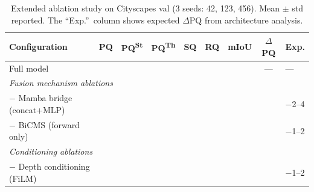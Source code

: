\documentclass[10pt,twocolumn,letterpaper]{article}
\begin{document}
\begin{table}[t]
\centering
\caption{Extended ablation study on Cityscapes val (3 seeds: 42, 123, 456). Mean $\pm$ std reported. The ``Exp.''\ column shows expected $\Delta$PQ from architecture analysis.}
\label{tab:ablations_extended}
\setlength{\tabcolsep}{3.5pt}
\begin{tabular}{lcccccccl}
\toprule
Configuration & PQ & PQ\textsuperscript{St} & PQ\textsuperscript{Th} & SQ & RQ & mIoU & $\Delta$PQ & Exp. \\
\midrule
Full model & \underline{\hspace{1.5em}} & \underline{\hspace{1.5em}} & \underline{\hspace{1.5em}} & \underline{\hspace{1.5em}} & \underline{\hspace{1.5em}} & \underline{\hspace{1.5em}} & --- & --- \\
\midrule
\multicolumn{9}{l}{\emph{Fusion mechanism ablations}} \\
$-$ Mamba bridge (concat+MLP) & \underline{\hspace{1.5em}} & \underline{\hspace{1.5em}} & \underline{\hspace{1.5em}} & \underline{\hspace{1.5em}} & \underline{\hspace{1.5em}} & \underline{\hspace{1.5em}} & \underline{\hspace{1.5em}} & $-$2--4 \\
$-$ BiCMS (forward only) & \underline{\hspace{1.5em}} & \underline{\hspace{1.5em}} & \underline{\hspace{1.5em}} & \underline{\hspace{1.5em}} & \underline{\hspace{1.5em}} & \underline{\hspace{1.5em}} & \underline{\hspace{1.5em}} & $-$1--2 \\
\midrule
\multicolumn{9}{l}{\emph{Conditioning ablations}} \\
$-$ Depth conditioning (FiLM) & \underline{\hspace{1.5em}} & \underline{\hspace{1.5em}} & \underline{\hspace{1.5em}} & \underline{\hspace{1.5em}} & \underline{\hspace{1.5em}} & \underline{\hspace{1.5em}} & \underline{\hspace{1.5em}} & $-$1--2 \\

\end{tabular}
\end{table}
\end{document}
